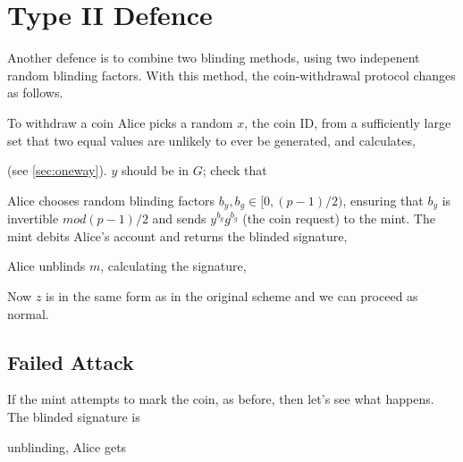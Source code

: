 \documentclass[a4paper,titlepage]{article}
\begin{document}
\section{Type II Defence}

Another defence is to combine two blinding methods, using two
indepenent random blinding factors. With this method, the
coin-withdrawal protocol changes as follows.

To withdraw a coin Alice picks a random $x$, the coin ID, from a
sufficiently large set that two equal values are unlikely to ever be
generated, and calculates,


(see \ref{sec:oneway}). $y$ should be in $G$; check that


Alice chooses random blinding factors $b_y,b_g \in [0,(p-1)/2)$,
ensuring that $b_y$ is invertible $mod (p-1)/2$ and
sends $y^{b_y} g^{b_g}$ (the coin request) to the mint. The mint
debits Alice's account and returns the blinded signature,


Alice unblinds $m$, calculating the signature,


Now $z$ is in the same form as in the original scheme and we can
proceed as normal.

\subsection{Failed Attack}

If the mint attempts to mark the coin, as before, then let's see what
happens. The blinded signature is


unblinding, Alice gets

\end{document}
